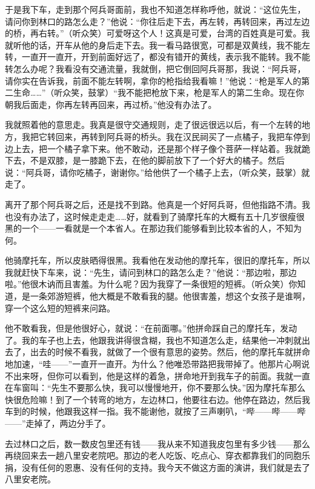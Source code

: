 \par 于是我下车，走到那个阿兵哥面前，我也不知道怎样称呼他，就说：“这位先生，请问你到林口的路怎么走？”他说：“你往后走下去，再左转，再转回来，再过左边的桥，再右转。”（听众笑）可爱呀这个人！这真是可爱，台湾的百姓真是可爱。我就听他的话，开车从他的身后走下去。我一看马路很宽，可都是双黄线，我不能左转，一直开一直开，开到前面好远了，都没有错开的黄线，表示我不能转。我不能转怎么办呢？我看没有交通流量，我就倒，把它倒回阿兵哥那，我说：“阿兵哥，请你实在告诉我，前面不能左转啊，拿你的枪指给我看嘛！”他说：“枪是军人的第二生命……”（听众笑，鼓掌）“我不能把枪放下来，枪是军人的第二生命。现在你朝我后面走，你再左转再回来，再过桥。”他没有办法了。
\par 我就照着他的意思走。我真是很守交通规则，走了很远很远以后，有一个左转的地方，我把它转回来，再转到阿兵哥的桥头。我在汉民祠买了一点橘子，我把车停到边上去，把一个橘子拿下来。他不敢动，还是那个样子像个菩萨一样站着。我就跪下去，不是双膝，是一膝跪下去，在他的脚前放下了一个好大的橘子。然后说：“阿兵哥，请你吃橘子，谢谢你。”给他供了一个橘子上去，（听众笑，鼓掌）就走了。
\par 离开了那个阿兵哥之后，还是找不到路。他真是一个好阿兵哥，但他指路不清。我也没有办法了，这时候走走走……好，就看到了骑摩托车的大概有五十几岁很瘦很黑的一个——一看就是一个本省人。在那边我们能够看到比较本省的人，不知为何。
\par 他骑摩托车，所以皮肤晒得很黑。我看他在发动他的摩托车，很旧的摩托车，所以我就赶快下车来，说：“先生，请问到林口的路怎么走？”他说：“那边啦，那边啦。”他很木讷而且害羞。为什么呢？因为我穿了一条很短的短裤。（听众笑）你知道，是一条郊游短裤，他大概是不敢看我的腿。他很害羞，想这个女孩子是谁啊，穿一个这么短的短裤来问路。
\par 他不敢看我，但是他很好心，就说：“在前面哪。”他拼命踩自己的摩托车，发动了。我的车子也上去，他跟我讲得很含糊，我也不知道怎么走，结果他一冲刺就出去了，出去的时候不看我，就做了一个很有意思的姿势。然后，他的摩托车就拼命地加速，“哇——”一直开一直开。为什么？他唯恐带路把我带掉了。他那片心啊说不出来呀，但你可以看到，他是这样的着急，拼命地开到我车子的前面。我就一直在车窗叫：“先生不要那么快，我可以慢慢地开，你不要那么快。”因为摩托车那么快很危险嘛！到了一个转弯的地方，左边林口，他要往右边。他停在路边，然后我车到的时候，他跟我这样一指。我不能谢他，就按了三声喇叭，“哔——哔——哔——”走掉了，两边分手了。
\par 去过林口之后，数一数皮包里还有钱——我从来不知道我皮包里有多少钱——那么再绕回来去一趟八里安老院吧。那边的老人吃饭、吃点心、穿衣都靠我们的同胞乐捐，没有任何的恩惠、没有任何的支持。我今天不做这方面的演讲，我们就是去了八里安老院。
